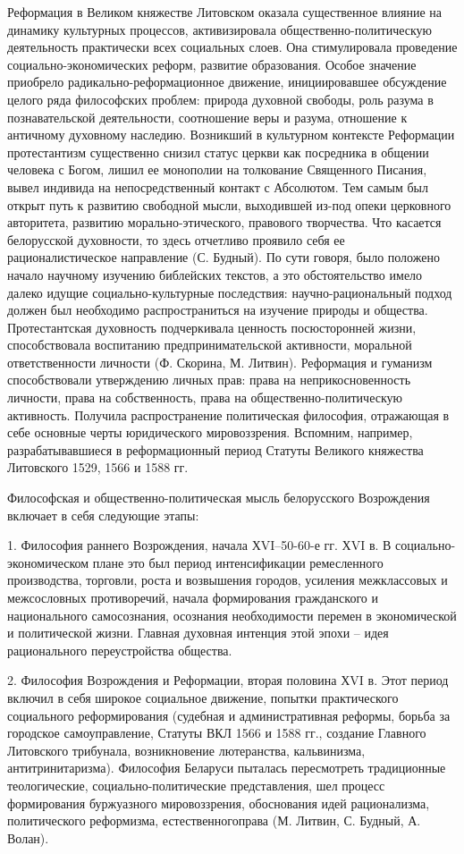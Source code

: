 Реформация в Великом княжестве Литовском оказала существенное влияние на динамику культурных процессов, активизировала общественно-политическую деятельность практически всех социальных слоев. Она стимулировала проведение социально-экономических реформ, развитие образования. Особое значение приобрело радикально-реформационное движение, инициировавшее обсуждение целого ряда философских проблем: природа духовной свободы, роль разума в познавательской деятельности, соотношение веры и разума, отношение к античному духовному наследию. Возникший в культурном контексте Реформации протестантизм существенно снизил статус церкви как посредника в общении человека с Богом, лишил ее монополии на толкование Священного Писания, вывел индивида на непосредственный контакт с Абсолютом. Тем самым был открыт путь к развитию свободной мысли, выходившей из-под опеки церковного авторитета, развитию морально-этического, правового творчества. Что касается белорусской духовности, то здесь отчетливо проявило себя ее рационалистическое направление (С. Будный). По сути говоря, было положено начало научному изучению библейских текстов, а это обстоятельство имело далеко идущие социально-культурные последствия: научно-рациональный подход должен был необходимо распространиться на изучение природы и общества. Протестантская духовность подчеркивала ценность посюсторонней жизни, способствовала воспитанию предпринимательской активности, моральной ответственности личности (Ф. Скорина, М. Литвин). Реформация и гуманизм способствовали утверждению личных прав: права на неприкосновенность личности, права на собственность, права на общественно-политическую активность. Получила распространение политическая философия, отражающая в себе основные черты юридического мировоззрения. Вспомним, например, разрабатывавшиеся в реформационный период Статуты Великого княжества Литовского 1529, 1566 и 1588 гг.

Философская и общественно-политическая мысль белорусского Возрождения включает в себя следующие этапы:

1. Философия раннего Возрождения, начала ХVI–50-60-е гг. ХVI в. В социально-экономическом плане это был период интенсификации ремесленного производства, торговли, роста и возвышения городов, усиления межклассовых и межсословных противоречий, начала формирования гражданского и национального самосознания, осознания необходимости перемен в экономической и политической жизни. Главная духовная интенция этой эпохи – идея рационального переустройства общества.

2. Философия Возрождения и Реформации, вторая половина ХVI в. Этот период включил в себя широкое социальное движение, попытки практического социального реформирования (судебная и административная реформы, борьба за городское самоуправление, Статуты ВКЛ 1566 и 1588 гг., создание Главного Литовского трибунала, возникновение лютеранства, кальвинизма, антитринитаризма). Философия Беларуси пыталась пересмотреть традиционные теологические, социально-политические представления, шел процесс формирования буржуазного мировоззрения, обоснования идей рационализма, политического реформизма, естественногоправа (М. Литвин, С. Будный, А. Волан).

